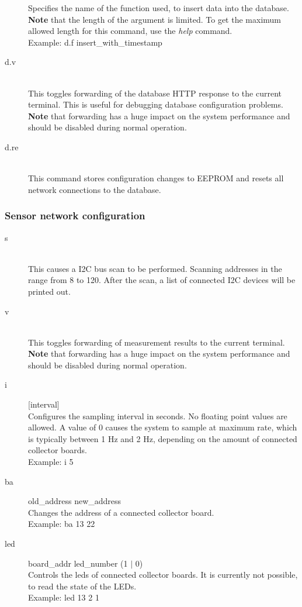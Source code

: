 \documentclass[a4paper]{scrreprt}
\begin{document}
\begin{description}
    Specifies the name of the function used, to insert data into the database.\\
    \textbf{Note} that the length of the argument is limited. To get the maximum allowed
    length for this command, use the \emph{help} command.\\
    Example: d.f insert\_with\_timestamp
  \item[d.v]\hspace{1cm}\\
    This toggles forwarding of the database HTTP response to the current terminal.
    This is useful for debugging database configuration problems.\\
    \textbf{Note} that forwarding has a huge impact on the system performance and should be
    disabled during normal operation.
  \item[d.re]\hspace{1cm}\\
    This command stores configuration changes to EEPROM and resets all network
    connections to the database.
\end{description}
\subsubsection{Sensor network configuration}
\begin{description}
  \item[s] \hspace{1cm}\\
    This causes a I2C bus scan to be performed. Scanning addresses in the range from
    8 to 120. After the scan, a list of connected I2C devices will be printed out.
  \item[v] \hspace{1cm}\\
    This toggles forwarding of measurement results to the current terminal.\\
    \textbf{Note} that forwarding has a huge impact on the system performance and should be
    disabled during normal operation.
  \item[i] [interval]\\
    Configures the sampling interval in seconds. No floating point values are allowed.
    A value of 0 causes the system to sample at maximum rate, which is typically
    between 1 Hz and 2 Hz, depending on the amount of connected collector boards.\\
    Example: i 5
  \item[ba] old\_address new\_address\\
    Changes the address of a connected collector board.\\
    Example: ba 13 22
  \item[led] board\_addr led\_number (1 $|$ 0)\\
    Controls the leds of connected collector boards. It is currently not possible, to read the state of the LEDs.\\
    Example: led 13 2 1
\end{description}
\end{document}

